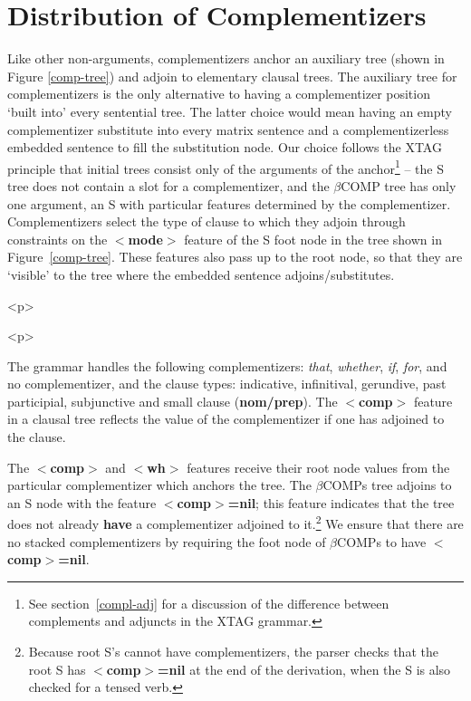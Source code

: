  
\section{Distribution of Complementizers} 
\label{comp-distr} 
 
Like other non-arguments, complementizers anchor an auxiliary tree (shown in 
Figure \ref{comp-tree}) and adjoin to elementary clausal trees.  The auxiliary 
tree for complementizers is the only alternative to having a complementizer 
position `built into' every sentential tree.  The latter choice would mean 
having an empty complementizer substitute into every matrix sentence and a 
complementizerless embedded sentence to fill the substitution node.  Our choice 
follows the XTAG principle that initial trees consist only of the arguments of 
the anchor\footnote{See section~\ref{compl-adj} for a discussion of the difference between complements and adjuncts in the XTAG grammar.} -- the S tree 
does not contain a slot for a complementizer, and the $\beta$COMP tree has only 
one argument, an S with particular features determined by the complementizer. 
Complementizers select the type of clause to which they adjoin through 
constraints on the {\bf $<$mode$>$} feature of the S foot node in the tree 
shown in Figure~\ref{comp-tree}.  These features also pass up to the root node, 
so that they are `visible' to the tree where the embedded sentence 
adjoins/substitutes. 
 
\begin{rawhtml} <p> \end{rawhtml}
\centering 
\hspace{0.0in} 
\begin{rawhtml} <dl> <dt>{Tree $\beta$COMPs, anchored by  that <p> </dl> \end{rawhtml}
\label{comp-tree} 
\begin{rawhtml} <p> \end{rawhtml}
 
The grammar handles the following complementizers: {\it that\/}, {\it whether\/}, {\it if\/}, {\it for\/}, and no complementizer, and the 
clause types: indicative, infinitival, gerundive, past participial, 
subjunctive and small clause ({\bf nom/prep}).  The {\bf $<$comp$>$} feature in a clausal tree reflects the value of the 
complementizer if one has adjoined to the clause. 
 
The {\bf $<$comp$>$} and {\bf $<$wh$>$} features receive their root 
node values from the particular complementizer which anchors the tree. 
The $\beta$COMPs tree adjoins to an S node with the feature {\bf $<$comp$>$=nil}; this feature indicates that the tree does not already 
{\bf have} a complementizer adjoined to it.\footnote{ Because root S's cannot have complementizers, the parser checks that the root S has {\bf $<$comp$>$=nil} at the end of the derivation, when the S is also checked for a tensed verb.} We ensure that there are no stacked complementizers by 
requiring the foot node of $\beta$COMPs to have {\bf $<$comp$>$=nil}. 
 
